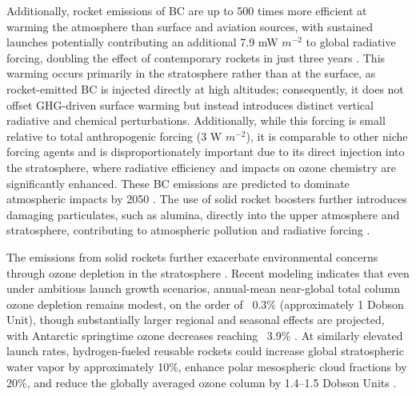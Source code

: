 \documentclass[pdflatex,sn-mathphys-num]{sn-jnl}
\theoremstyle{thmstyleone}%
\theoremstyle{thmstyletwo}%
\theoremstyle{thmstylethree}%
\begin{document}
Additionally, rocket emissions of BC are up to 500 times more efficient at warming the atmosphere than surface and aviation sources, with sustained launches potentially contributing an additional 7.9 mW $m^{-2}$ to global radiative forcing, doubling the effect of contemporary rockets in just three years \citep{ryan_impact_nodate}. This warming occurs primarily in the stratosphere rather than at the surface, as rocket-emitted BC is injected directly at high altitudes; consequently, it does not offset GHG-driven surface warming but instead introduces distinct vertical radiative and chemical perturbations. Additionally, while this forcing is small relative to total anthropogenic forcing (3 W $m^{-2}$), it is comparable to other niche forcing agents and is disproportionately important due to its direct injection into the stratosphere, where radiative efficiency and impacts on ozone chemistry are significantly enhanced. These BC emissions are predicted to dominate atmospheric impacts by 2050 \citep{tsigaridis_composition_nodate}. The use of solid rocket boosters further introduces damaging particulates, such as alumina, directly into the upper atmosphere and stratosphere, contributing to atmospheric pollution and radiative forcing \citep{ross_radiative_2014}.

The emissions from solid rockets further exacerbate environmental concerns through ozone depletion in the stratosphere \citep{ross_observation_1997, donou-adonsou_space_2024}. Recent modeling indicates that even under ambitious launch growth scenarios, annual-mean near-global total column ozone depletion remains modest, on the order of ~0.3\% (approximately 1 Dobson Unit), though substantially larger regional and seasonal effects are projected, with Antarctic springtime ozone decreases reaching ~3.9\% \citep{revell_near-future_2025}. At similarly elevated launch rates, hydrogen-fueled reusable rockets could increase global stratospheric water vapor by approximately 10\%, enhance polar mesospheric cloud fractions by 20\%, and reduce the globally averaged ozone column by 1.4–1.5 Dobson Units \citep{larson_global_2017}.
\end{document}
